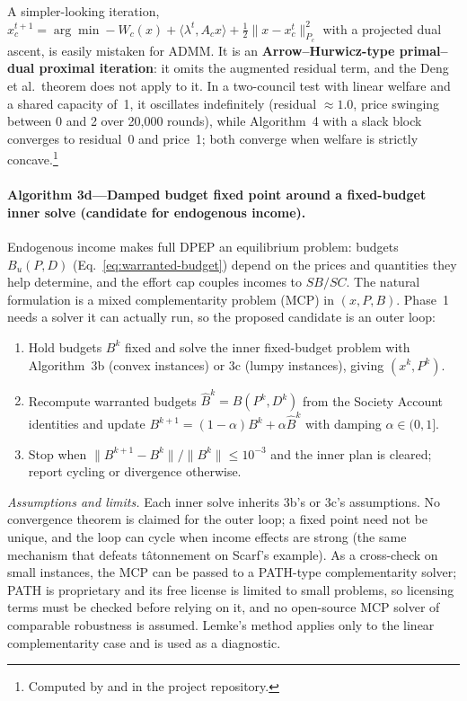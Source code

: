 \documentclass[10pt,twoside,openany]{book}
\theoremstyle{dpepstyle}
\begin{document}
A simpler-looking iteration, $x_c^{t+1} = \arg\min -W_c(x) + \langle\lambda^t, A_c x\rangle + \tfrac12\|x - x_c^t\|_{P_c}^2$ with a projected dual ascent, is easily mistaken for ADMM. It is an \textbf{Arrow--Hurwicz-type primal--dual proximal iteration}: it omits the augmented residual term, and the Deng et al.\ theorem does not apply to it. In a two-council test with linear welfare and a shared capacity of~1, it oscillates indefinitely (residual $\approx 1.0$, price swinging between 0 and 2 over 20,000 rounds), while Algorithm~4 with a slack block converges to residual~0 and price~1; both converge when welfare is strictly concave.\footnote{Computed by  and  in the project repository.}

\paragraph{Algorithm 3d---Damped budget fixed point around a fixed-budget inner solve (candidate for endogenous income).}
Endogenous income makes full DPEP an equilibrium problem: budgets $B_u(P,D)$ (Eq.~\ref{eq:warranted-budget}) depend on the prices and quantities they help determine, and the effort cap couples incomes to $SB/SC$. The natural formulation is a mixed complementarity problem (MCP) in $(x, P, B)$. Phase~1 needs a solver it can actually run, so the proposed candidate is an outer loop:
\begin{enumerate}[leftmargin=1.6em,itemsep=1pt]
  \item Hold budgets $B^{k}$ fixed and solve the inner fixed-budget problem with Algorithm~3b (convex instances) or 3c (lumpy instances), giving $(x^k, P^k)$.
  \item Recompute warranted budgets $\hat B^{k} = B(P^k, D^k)$ from the Society Account identities and update $B^{k+1} = (1-\alpha)B^k + \alpha \hat B^k$ with damping $\alpha \in (0,1]$.
  \item Stop when $\|B^{k+1}-B^k\|/\|B^k\| \le 10^{-3}$ and the inner plan is cleared; report cycling or divergence otherwise.
\end{enumerate}
\emph{Assumptions and limits.} Each inner solve inherits 3b's or 3c's assumptions. No convergence theorem is claimed for the outer loop; a fixed point need not be unique, and the loop can cycle when income effects are strong (the same mechanism that defeats t\^atonnement on Scarf's example). As a cross-check on small instances, the MCP can be passed to a PATH-type complementarity solver; PATH is proprietary and its free license is limited to small problems, so licensing terms must be checked before relying on it, and no open-source MCP solver of comparable robustness is assumed. Lemke's method applies only to the linear complementarity case and is used as a diagnostic.
\end{document}
